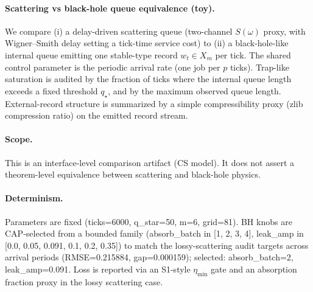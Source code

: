 \paragraph{Scattering vs black-hole queue equivalence (toy).} \AuditTag We compare (i) a delay-driven scattering queue (two-channel $S(\omega)$ proxy, with Wigner--Smith delay setting a tick-time service cost) to (ii) a black-hole-like internal queue emitting one stable-type record $w_t\in X_m$ per tick. The shared control parameter is the periodic arrival rate (one job per $p$ ticks). Trap-like saturation is audited by the fraction of ticks where the internal queue length exceeds a fixed threshold $q_\star$, and by the maximum observed queue length. External-record structure is summarized by a simple compressibility proxy (zlib compression ratio) on the emitted record stream.
\paragraph{Scope.} \AuditTag This is an interface-level comparison artifact (CS model). It does not assert a theorem-level equivalence between scattering and black-hole physics.
\paragraph{Determinism.} \AuditTag Parameters are fixed (ticks=6000, q\_star=50, m=6, grid=81). BH knobs are CAP-selected from a bounded family (absorb\_batch in [1, 2, 3, 4], leak\_amp in [0.0, 0.05, 0.091, 0.1, 0.2, 0.35]) to match the lossy-scattering audit targets across arrival periods (RMSE=0.215884, gap=0.000159); selected: absorb\_batch=2, leak\_amp=0.091. Loss is reported via an S1-style $\eta_{\min}$ gate and an absorption fraction proxy in the lossy scattering case.